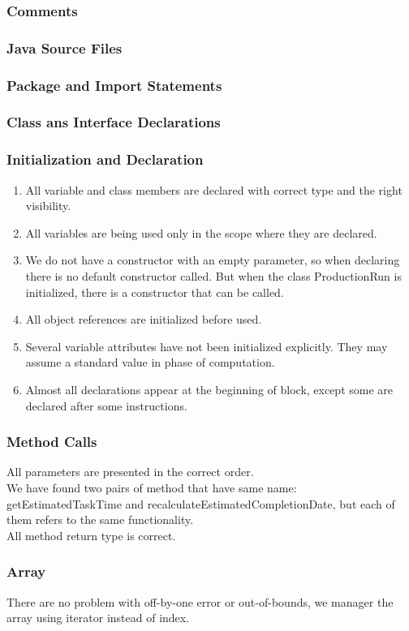 \documentclass{article}
\begin{document}
  \subsubsection{Comments}
  \subsubsection{Java Source Files}
  \subsubsection{Package and Import Statements}
  \subsubsection{Class ans Interface Declarations}
\subsubsection{Initialization and Declaration}
\begin{enumerate}
	\item
	All variable and class members are declared with correct type and the right visibility.
	\item
	All variables are being used only in the scope where they are declared.
	\item
	We do not have a constructor with  an empty parameter, so when declaring there is no  default constructor called. But when the class ProductionRun is initialized, there is a constructor that can be called.
	\item
	All object references are initialized before used.
	\item
	Several variable attributes have not been initialized explicitly. They may assume a standard value in phase of computation. 
	\item
	Almost all declarations appear at the beginning of block, except some are declared after some instructions.
\end{enumerate}
\subsubsection{Method Calls}
All parameters are presented in the correct order.\\
We have found two pairs of method that have same name: getEstimatedTaskTime and recalculateEstimatedCompletionDate, but each of them  refers to the same functionality.\\
All method return type is correct.
\subsubsection{Array}
There are no problem with off-by-one error or out-of-bounds, we manager the array using iterator instead of index.
\end{document}
